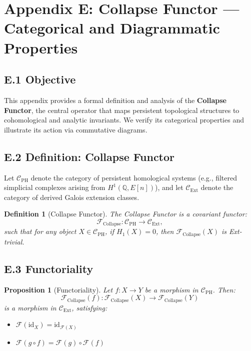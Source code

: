 \documentclass[11pt]{article}
\newtheorem{definition}[theorem]{Definition}
\newtheorem{proposition}[theorem]{Proposition}
\newcommand{\QQ}{\mathbb{Q}}
\begin{document}

\section*{Appendix E: Collapse Functor — Categorical and Diagrammatic Properties}

\subsection*{E.1 Objective}

This appendix provides a formal definition and analysis of the \textbf{Collapse Functor}, the central operator that maps persistent topological structures to cohomological and analytic invariants.  
We verify its categorical properties and illustrate its action via commutative diagrams.

\subsection*{E.2 Definition: Collapse Functor}

Let $\mathcal{C}_{\mathrm{PH}}$ denote the category of persistent homological systems (e.g., filtered simplicial complexes arising from $H^1(\QQ, E[n])$), and let $\mathcal{C}_{\mathrm{Ext}}$ denote the category of derived Galois extension classes.

\begin{definition}[Collapse Functor]
The \emph{Collapse Functor} is a covariant functor:
\[
\mathcal{F}_{\mathrm{Collapse}} : \mathcal{C}_{\mathrm{PH}} \longrightarrow \mathcal{C}_{\mathrm{Ext}},
\]
such that for any object $X \in \mathcal{C}_{\mathrm{PH}}$, if $H_1(X) = 0$, then $\mathcal{F}_{\mathrm{Collapse}}(X)$ is Ext-trivial.
\end{definition}

\subsection*{E.3 Functoriality}

\begin{proposition}[Functoriality]
\label{prop:collapse-functoriality}
Let $f: X \to Y$ be a morphism in $\mathcal{C}_{\mathrm{PH}}$.  
Then:
\[
\mathcal{F}_{\mathrm{Collapse}}(f) : \mathcal{F}_{\mathrm{Collapse}}(X) \to \mathcal{F}_{\mathrm{Collapse}}(Y)
\]
is a morphism in $\mathcal{C}_{\mathrm{Ext}}$, satisfying:
\begin{itemize}
  \item $\mathcal{F}(\mathrm{id}_X) = \mathrm{id}_{\mathcal{F}(X)}$
  \item $\mathcal{F}(g \circ f) = \mathcal{F}(g) \circ \mathcal{F}(f)$
\end{itemize}
\end{proposition}
\end{document}
